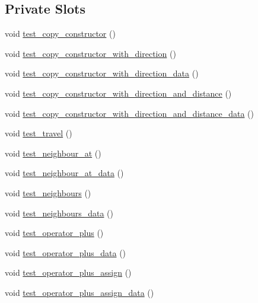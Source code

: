 \subsection*{Private Slots}
\begin{DoxyCompactItemize}
\item 
void \hyperlink{classdefault__coordinate_a71fcd0aa8e050299b51d37d0a5510693}{test\-\_\-copy\-\_\-constructor} ()
\item 
void \hyperlink{classdefault__coordinate_ab509ca94677873f51fd7f36ff08f6b6e}{test\-\_\-copy\-\_\-constructor\-\_\-with\-\_\-direction} ()
\item 
void \hyperlink{classdefault__coordinate_aea1ecde0e6af8c66f4ae09b859ba9abe}{test\-\_\-copy\-\_\-constructor\-\_\-with\-\_\-direction\-\_\-data} ()
\item 
void \hyperlink{classdefault__coordinate_a6ac1346bb3e21f989282554eeff6fa6b}{test\-\_\-copy\-\_\-constructor\-\_\-with\-\_\-direction\-\_\-and\-\_\-distance} ()
\item 
void \hyperlink{classdefault__coordinate_a8c8c4df572230ebc9421ab39cfb236cb}{test\-\_\-copy\-\_\-constructor\-\_\-with\-\_\-direction\-\_\-and\-\_\-distance\-\_\-data} ()
\item 
void \hyperlink{classdefault__coordinate_acdd8347e4ae9325221f1056270d1ef5b}{test\-\_\-travel} ()
\item 
void \hyperlink{classdefault__coordinate_a66fb93f53378b5448839a822e9942c98}{test\-\_\-neighbour\-\_\-at} ()
\item 
void \hyperlink{classdefault__coordinate_ae6eaad96449fbbad9058494c33347f19}{test\-\_\-neighbour\-\_\-at\-\_\-data} ()
\item 
void \hyperlink{classdefault__coordinate_a1d8fe20449e7ace996ce4728c932259b}{test\-\_\-neighbours} ()
\item 
void \hyperlink{classdefault__coordinate_acd5ed771bff170097b543bb461c01541}{test\-\_\-neighbours\-\_\-data} ()
\item 
void \hyperlink{classdefault__coordinate_aaa187cf2b16d29002fcb03e9144f3e52}{test\-\_\-operator\-\_\-plus} ()
\item 
void \hyperlink{classdefault__coordinate_a26a03d9d0a1d9c9e4d168c66a9799fa5}{test\-\_\-operator\-\_\-plus\-\_\-data} ()
\item 
void \hyperlink{classdefault__coordinate_a5408954bafdc1ef476508e844cfbc14e}{test\-\_\-operator\-\_\-plus\-\_\-assign} ()
\item 
void \hyperlink{classdefault__coordinate_adfc67ea0828768f5dbdc2ee0c20291a4}{test\-\_\-operator\-\_\-plus\-\_\-assign\-\_\-data} ()

\end{DoxyCompactItemize}
